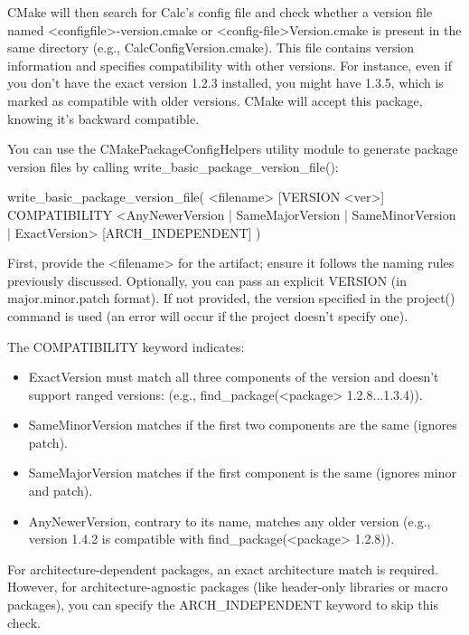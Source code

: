 CMake will then search for Calc's config file and check whether a version file named <configfile>-version.cmake or <config-file>Version.cmake is present in the same directory (e.g., CalcConfigVersion.cmake). This file contains version information and specifies compatibility with other versions. For instance, even if you don’t have the exact version 1.2.3 installed, you might have 1.3.5, which is marked as compatible with older versions. CMake will accept this package, knowing it’s backward compatible.

You can use the CMakePackageConfigHelpers utility module to generate package version files by calling write\_basic\_package\_version\_file():

\begin{shell}
write_basic_package_version_file(
    <filename> [VERSION <ver>]
    COMPATIBILITY <AnyNewerVersion | SameMajorVersion |
    SameMinorVersion | ExactVersion>
    [ARCH_INDEPENDENT]
)
\end{shell}

First, provide the <filename> for the artifact; ensure it follows the naming rules previously discussed. Optionally, you can pass an explicit VERSION (in major.minor.patch format). If not provided, the version specified in the project() command is used (an error will occur if the project doesn’t specify one).

The COMPATIBILITY keyword indicates:

\begin{itemize}
\item
ExactVersion must match all three components of the version and doesn’t support ranged versions: (e.g., find\_package(<package> 1.2.8...1.3.4)).

\item
SameMinorVersion matches if the first two components are the same (ignores patch).

\item
SameMajorVersion matches if the first component is the same (ignores minor and patch).

\item
AnyNewerVersion, contrary to its name, matches any older version (e.g., version 1.4.2 is compatible with find\_package(<package> 1.2.8)).
\end{itemize}

For architecture-dependent packages, an exact architecture match is required. However, for architecture-agnostic packages (like header-only libraries or macro packages), you can specify the ARCH\_INDEPENDENT keyword to skip this check.

